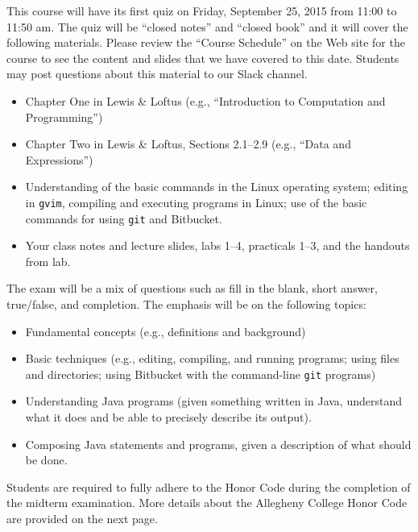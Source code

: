 


This course will have its first quiz on Friday, September 25, 2015 from 11:00 to 11:50 am. The quiz will be ``closed
notes'' and ``closed book'' and it will cover the following materials. Please review the ``Course Schedule'' on the Web
site for the course to see the content and slides that we have covered to this date. Students may post questions about
this material to our Slack channel.

\begin{itemize}

  \item Chapter One in Lewis \& Loftus (e.g., ``Introduction to Computation and Programming'')

  \item Chapter Two in Lewis \& Loftus, Sections 2.1--2.9 (e.g., ``Data and Expressions'')

  \item Understanding of the basic commands in the Linux operating system; editing in {\tt gvim}, compiling and executing
    programs in Linux; use of the basic commands for using {\tt git} and Bitbucket.

  \item Your class notes and lecture slides, labs 1--4, practicals 1--3, and the handouts from lab.

\end{itemize}

\noindent The exam will be a mix of questions such as fill in the blank, short answer, true/false, and completion.  The
emphasis will be on the following topics:

\begin{itemize}
\item
Fundamental concepts (e.g., definitions and background)
\item
Basic techniques (e.g., editing, compiling, and running programs; using
  files and directories; using Bitbucket with the command-line {\tt git} programs)
\item
Understanding Java programs (given something written in Java, understand
what it does and be able to precisely describe its output).
\item
Composing Java statements and programs, given a description of what
should be done.
\end{itemize}

\noindent
Students are required to fully adhere to the Honor Code during the completion of the midterm examination. More details
about the Allegheny College Honor Code are provided on the next page.




